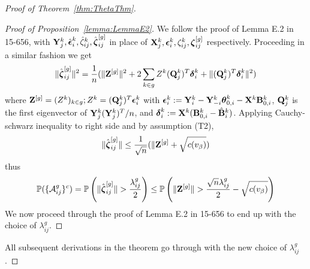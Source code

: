 \documentclass[fleqn,11pt]{article}
\numberwithin{equation}{section}
\begin{document}
\begin{proof}[Proof of Theorem~\ref{thm:ThetaThm}]
\begin{proof}[Proof of Proposition~\ref{lemma:LemmaE2}]
We follow the proof of Lemma E.2 in 15-656, with ${\mathbf{Y}}_j^k, \hat {{\boldsymbol{\epsilon}}}_i^k, \hat \zeta_{ij}^k, \hat {{\boldsymbol{\zeta}}}_{ij}^{[g]}$ in place of ${\mathbf{X}}_j^k, {\boldsymbol{\epsilon}}_i^k, \zeta_{ij}^k, {\boldsymbol{\zeta}}_{ij}^{[g]}$ respectively. Proceeding in a similar fashion we get
%
$$
\| \hat {{\boldsymbol{\zeta}}}_{ij}^{[g]} \|^2 = \frac{1}{n} ( \| {\mathbf{Z}}^{[g]} \|^2 + 2 \sum_{k \in g} Z^k ({\mathbf{Q}}_j^k)^T {\boldsymbol{\delta}}_i^k + \| ({\mathbf{Q}}_j^k)^T {\boldsymbol{\delta}}_i^k  \|^2)
$$
%
where ${\mathbf{Z}}^{[g]} = (Z^k)_{k \in g}; Z^k = ({\mathbf{Q}}_j^k)^T {\boldsymbol{\epsilon}}_i^k$ with ${\boldsymbol{\epsilon}}_i^k := {\mathbf{Y}}_i^k - {\mathbf{Y}}_{-i}^k {\boldsymbol{\theta}}_{0,i}^k - {\mathbf{X}}^k {\mathbf{B}}_{0,i}^k$, ${\mathbf{Q}}_j^k$ is the first eigenvector of ${\mathbf{Y}}_j^k ({\mathbf{Y}}_j^k)^T/n$, and ${\boldsymbol{\delta}}_i^k := {\mathbf{X}}^k ({\mathbf{B}}_{0,i}^k - \hat {{\mathbf{B}}}_i^k)$. Applying Cauchy-schwarz inequality to right side and by assumption (T2),
%
$$
\| \hat {{\boldsymbol{\zeta}}}_{ij}^{[g]} \| \leq \frac{1}{\sqrt n} ( \| {\mathbf{Z}}^{[g]} + \sqrt{ c(v_\beta)})
$$
%
thus
$$
{\mathbb{P}} ( \{ {\cal{A}}_{ij}^g \}^c ) = {\mathbb{P}} \left( \| \hat {{\boldsymbol{\zeta}}}_{ij}^{[g]} \| > \frac{\lambda_{ij}^g}{2} \right) \leq {\mathbb{P}} \left( \| {\mathbf{Z}}^{[g]} \|  > \frac{\sqrt n \lambda_{ij}^g}{2} - \sqrt{c(v_\beta)}  \right)
$$
We now proceed through the proof of Lemma E.2 in 15-656 to end up with the choice of $\lambda_{ij}^g$.
\end{proof}
%

All subsequent derivations in the theorem go through with the new choice of $\lambda_{ij}^g$.


\end{proof}
\end{document}
